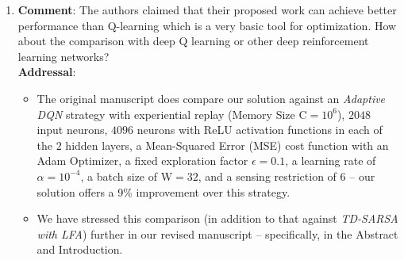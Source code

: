\documentclass{article}
\begin{document}
\begin{enumerate}
    \item \textbf{Comment}: The authors claimed that their proposed work can achieve better performance than Q-learning which is a very basic tool for optimization. How about the comparison with deep Q learning or other deep reinforcement learning networks?\\
    \textbf{Addressal}: 
    \begin{itemize}
        \item The original manuscript does compare our solution against an \textit{Adaptive DQN} strategy with experiential replay (Memory Size C${=}10^{6}$), $2048$ input neurons, $4096$ neurons with ReLU activation functions in each of the $2$ hidden layers, a Mean-Squared Error (MSE) cost function with an Adam Optimizer, a fixed exploration factor $\epsilon{=}0.1$, a learning rate of $\alpha{=}10^{{-}4}$, a batch size of W${=}32$, and a sensing restriction of $6$ -- our solution offers a 9\% improvement over this strategy.
        \item We have stressed this comparison (in addition to that against \textit{TD-SARSA with LFA}) further in our revised manuscript -- specifically, in the Abstract and Introduction.
    \end{itemize}
    

\end{enumerate}
\end{document}
